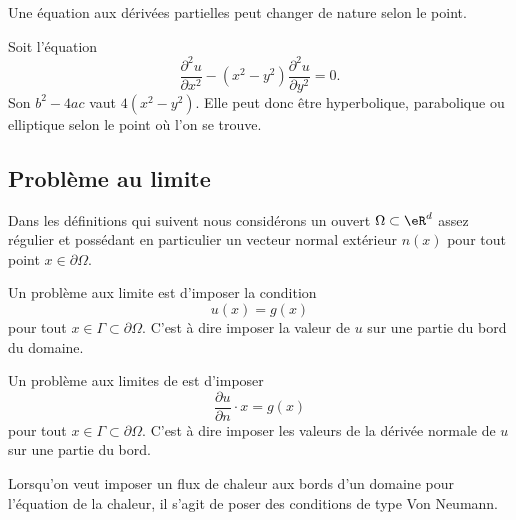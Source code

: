 Une équation aux dérivées partielles peut changer de nature selon le point.

\begin{example}
    Soit l'équation
    \begin{equation}
        \frac{ \partial^2u }{ \partial x^2 }-(x^2-y^2)\frac{ \partial^2u }{ \partial y^2 }=0.
    \end{equation}
    Son \( b^2-4ac\) vaut \( 4(x^2-y^2)\). Elle peut donc être hyperbolique, parabolique ou elliptique selon le point où l'on se trouve.
\end{example}

\subsection{Problème au limite}

Dans les définitions qui suivent nous considérons un ouvert \( \Omega\subset \eR^d\) assez régulier et possédant en particulier un vecteur normal extérieur \( n(x)\) pour tout point \( x\in\partial\Omega\).

\begin{definition}
    Un problème aux limite  est d'imposer la condition
    \begin{equation}
        u(x)=g(x)
    \end{equation}
    pour tout \( x\in\Gamma\subset \partial\Omega\). C'est à dire imposer la valeur de \( u\) sur une partie du bord du domaine.
\end{definition}

\begin{definition}
    Un problème aux limites de  est d'imposer
    \begin{equation}
        \frac{ \partial u }{ \partial n }\cdot x=g(x)
    \end{equation}
    pour tout \( x\in\Gamma\subset\partial\Omega\). C'est à dire imposer les valeurs de la dérivée normale de \( u\) sur une partie du bord.
\end{definition}

\begin{example}
    Lorsqu'on veut imposer un flux de chaleur aux bords d'un domaine pour l'équation de la chaleur, il s'agit de poser des conditions de type Von Neumann.
\end{example}

